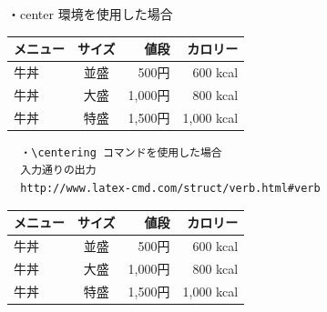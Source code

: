 \documentclass[a4paper,11pt]{jsarticle}
\begin{document}
\newpage
\begin{flushleft}
  ・center 環境を使用した場合
\end{flushleft}
\begin{table}[htb]
  \begin{center}
    \begin{tabular}{|l|c|r||r|} \hline
      メニュー & サイズ & 値段 & カロリー \\ \hline \hline
      牛丼 & 並盛 & 500円 & 600 kcal \\
      牛丼 & 大盛 & 1,000円 & 800 kcal \\
      牛丼 & 特盛 & 1,500円 & 1,000 kcal \\ \hline
    \end{tabular}
  \end{center}
\end{table}

\begin{verbatim}
  ・\centering コマンドを使用した場合
  入力通りの出力
  http://www.latex-cmd.com/struct/verb.html#verb
\end{verbatim}

\begin{table}[htb]
  \centering
  \begin{tabular}{|l|c|r||r|} \hline
    メニュー & サイズ & 値段 & カロリー \\ \hline \hline
    牛丼 & 並盛 & 500円 & 600 kcal \\
    牛丼 & 大盛 & 1,000円 & 800 kcal \\
    牛丼 & 特盛 & 1,500円 & 1,000 kcal \\ \hline
  \end{tabular}
\end{table}

\newpage
\end{document}
